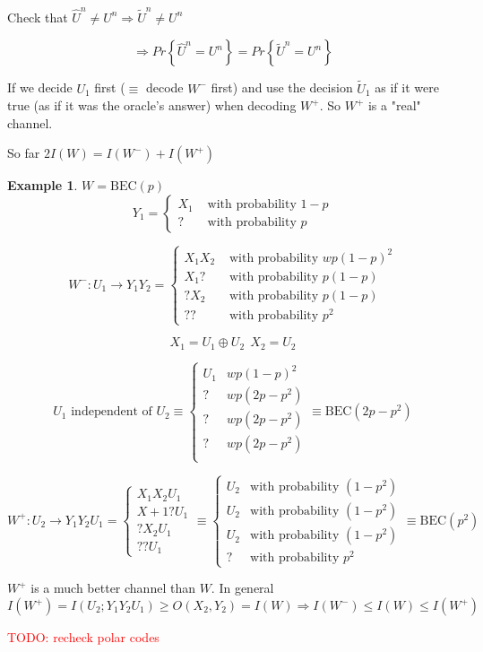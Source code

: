 \documentclass[twoside]{article}
\theoremstyle{definition} %
\newtheorem{example}{Example}
\newcommand{\todo}[1]{\textcolor{red}{TODO: #1}}
\renewcommand{\Pr}[1]{Pr\left\{#1\right\}}
\begin{document}
Check that $\hat U^n \not = U^n \Rightarrow \tilde U^n \not = U^n$

\[
  \Rightarrow \Pr{\hat U ^n = U^n} = \Pr{\tilde U^n = U^n}
\]

If we decide $U_1$ first ($\equiv$ decode $W^-$ first) and use the decision $\tilde U_1$ as if it were true (as if it was the oracle's answer) when decoding $W^+$. So $W^+$ is a "real" channel.

So far $2I(W) = I(W^-) + I(W^+)$

\begin{example}
  $W=\text{BEC}(p)$
  \[
    Y_1 = \begin{cases}
      X_1 & \text{ with probability } 1 - p\\
      ? & \text{ with probability } p
    \end{cases}
  \]

  \[
    W^-:U_1 \rightarrow Y_1 Y_2 =
    \begin{cases}
      X_1X_2 & \text{ with probability } wp(1-p)^2\\
      X_1 ? & \text{ with probability } p(1-p)\\
      ?X_2 & \text{ with probability } p(1-p)\\
      ? ? & \text{ with probability } p^2
    \end{cases}
  \]

  \[
    X_1 = U_1 \oplus U_2~~X_2=U_2
  \]

  \[
    U_1 \text{ independent of } U_2 \equiv \begin{cases}
      U_1&wp(1-p)^2\\
      ?&wp(2p-p^2)\\
      ?&wp(2p-p^2)\\
      ?&wp(2p-p^2)\\
    \end{cases} \equiv \text{BEC}(2p - p^2)
  \]

  \[
    W^+:U_2 \rightarrow Y_1Y_2U_1 = \begin{cases}
      X_1X_2U_1\\
      X+1 ? U_1\\
      ?X_2 U_1\\
      ??U_1
    \end{cases}
    \equiv
    \begin{cases}
      U_2& \text{with probability } (1-p^2)\\
      U_2& \text{with probability } (1-p^2)\\
      U_2& \text{with probability } (1-p^2)\\
      ?& \text{with probability } p^2
    \end{cases}
    \equiv
    \text{BEC}(p^2)
  \]

  $W^+$ is a much better channel than $W$. In general
  \[
    I(W^+) = I(U_2;Y_1Y_2U_1) \geq O(X_2,Y_2) = I(W) \Rightarrow I(W^-) \leq I(W) \leq I(W^+)
  \]
\end{example}
  \todo{recheck polar codes}
\end{document}
